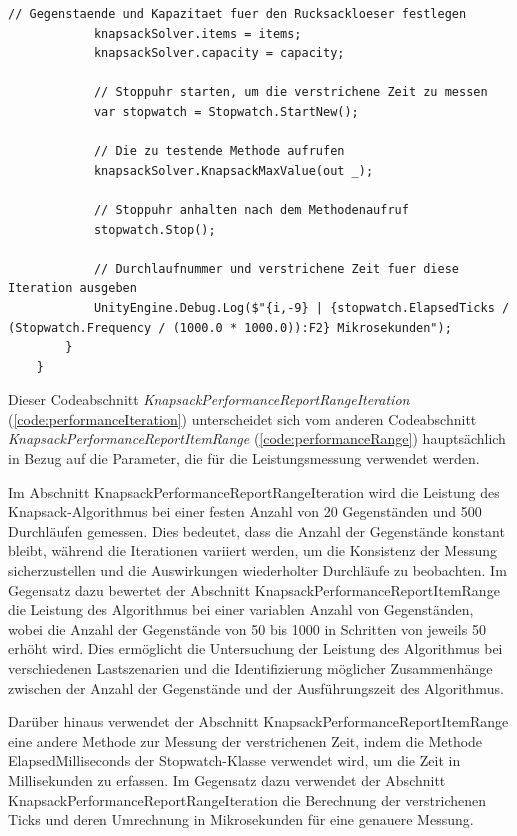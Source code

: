\begin{itemize}
\begin{lstlisting}[style=csharp, caption={Codeabschnitt: Performance Messung bei 500 Aufrufen von 20 Gegenständen}, label={code:performanceIteration}]
            // Gegenstaende und Kapazitaet fuer den Rucksackloeser festlegen
            knapsackSolver.items = items;
            knapsackSolver.capacity = capacity;

            // Stoppuhr starten, um die verstrichene Zeit zu messen
            var stopwatch = Stopwatch.StartNew();

            // Die zu testende Methode aufrufen
            knapsackSolver.KnapsackMaxValue(out _);

            // Stoppuhr anhalten nach dem Methodenaufruf
            stopwatch.Stop();

            // Durchlaufnummer und verstrichene Zeit fuer diese Iteration ausgeben
            UnityEngine.Debug.Log($"{i,-9} | {stopwatch.ElapsedTicks / (Stopwatch.Frequency / (1000.0 * 1000.0)):F2} Mikrosekunden");
        }
    }
\end{lstlisting}


Dieser Codeabschnitt \textit{KnapsackPerformanceReportRangeIteration} (\ref{code:performanceIteration}) unterscheidet sich vom anderen Codeabschnitt \textit{KnapsackPerformanceReportItemRange} (\ref{code:performanceRange}) hauptsächlich in Bezug auf die Parameter, die für die Leistungsmessung verwendet werden.

Im Abschnitt KnapsackPerformanceReportRangeIteration wird die Leistung des Knapsack-Algorithmus bei einer festen Anzahl von 20 Gegenständen und 500 Durchläufen gemessen. Dies bedeutet, dass die Anzahl der Gegenstände konstant bleibt, während die Iterationen variiert werden, um die Konsistenz der Messung sicherzustellen und die Auswirkungen wiederholter Durchläufe zu beobachten. Im Gegensatz dazu bewertet der Abschnitt KnapsackPerformanceReportItemRange die Leistung des Algorithmus bei einer variablen Anzahl von Gegenständen, wobei die Anzahl der Gegenstände von 50 bis 1000 in Schritten von jeweils 50 erhöht wird. Dies ermöglicht die Untersuchung der Leistung des Algorithmus bei verschiedenen Lastszenarien und die Identifizierung möglicher Zusammenhänge zwischen der Anzahl der Gegenstände und der Ausführungszeit des Algorithmus.

Darüber hinaus verwendet der Abschnitt KnapsackPerformanceReportItemRange eine andere Methode zur Messung der verstrichenen Zeit, indem die Methode ElapsedMilliseconds der Stopwatch-Klasse verwendet wird, um die Zeit in Millisekunden zu erfassen. Im Gegensatz dazu verwendet der Abschnitt KnapsackPerformanceReportRangeIteration die Berechnung der verstrichenen Ticks und deren Umrechnung in Mikrosekunden für eine genauere Messung.


\end{itemize}
